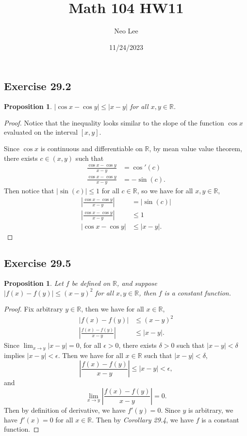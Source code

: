 \documentclass{article}
\title{Math 104 HW11}
\author{Neo Lee}
\date{11/24/2023}
\newtheorem{proposition}[thm]{Proposition}
\newcommand*{\R}{\ensuremath{\mathbb{R}}}
\begin{document}
 

\maketitle 

\subsection*{Exercise 29.2}
\begin{proposition}
    $|\cos x-\cos y|\le |x-y|$ for all $x,y\in\R$.
\end{proposition}
\begin{proof}
    Notice that the inequality looks similar to the slope of the function $\cos x$ evaluated 
    on the interval $[x,y]$.

    Since $\cos x$ is continuous and differentiable on $\R$, by mean value value theorem, 
    there exists $c\in(x,y)$ such that
    \begin{align*}
        \frac{\cos x - \cos y}{x-y} & = \cos'(c) \\
        \frac{\cos x - \cos y}{x-y} & = -\sin(c).
    \end{align*}
    Then notice that $|\sin(c)|\le 1$ for all $c\in\R$, so we have for all $x,y\in\R$,
    \begin{align*}
        \left|\frac{\cos x - \cos y}{x-y}\right| & = |\sin(c)| \\
        \left|\frac{\cos x - \cos y}{x-y}\right| & \le 1 \\
        |\cos x - \cos y| & \le |x-y|.
    \end{align*}
\end{proof}

\newpage
\subsection*{Exercise 29.5}
\begin{proposition}
    Let $f$ be defined on \R, and suppose $|f(x)-f(y)|\le(x-y)^2$ for all $x,y\in\R$, 
    then $f$ is a constant function.
\end{proposition}
\begin{proof}
    Fix arbitrary $y\in\R$, then we have for all $x\in\R$,
    \begin{align*}
        |f(x)-f(y)| & \le (x-y)^2 \\
        \left|\frac{f(x)-f(y)}{x-y}\right| & \le |x-y|.
    \end{align*}
    Since $\lim_{x\to y}|x-y| = 0$, for all $\epsilon>0$, there exists $\delta>0$ such that
    $|x-y|<\delta$ implies $|x-y|<\epsilon$. Then we have for all $x\in\R$ such that 
    $|x-y|<\delta$, 
    $$\left|\frac{f(x)-f(y)}{x-y}\right| \le |x-y|<\epsilon,$$
    and $$\lim_{x\to y}\left|\frac{f(x)-f(y)}{x-y}\right|=0.$$
    Then by definition of derivative, we have $f'(y)=0$. Since $y$ is arbitrary,
    we have $f'(x)=0$ for all $x\in\R$. Then by \emph{Corollary 29.4}, we have $f$ is a constant
    function.
\end{proof}
\end{document}
